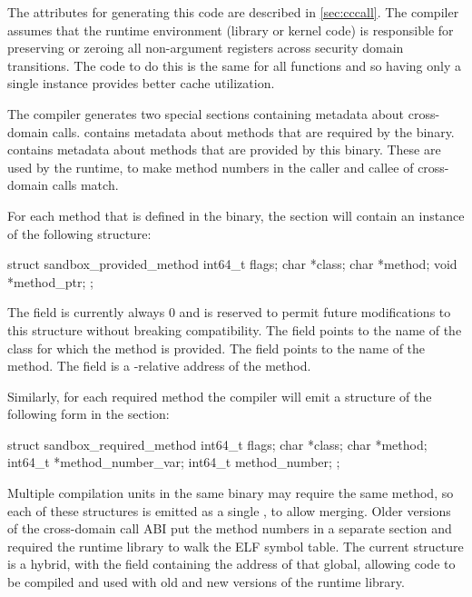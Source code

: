 The attributes for generating this code are described in \autoref{sec:cccall}.
The compiler assumes that the runtime environment (library or kernel code) is responsible for preserving or zeroing all non-argument registers across security domain transitions.
The code to do this is the same for all functions and so having only a single instance provides better cache utilization.

The compiler generates two special sections containing metadata about cross-domain calls.
 contains metadata about methods that are required by the binary.
 contains metadata about methods that are provided by this binary.
These are used by the  runtime, to make method numbers in the caller and callee of cross-domain calls match.

For each method that is defined in the binary, the  section will contain an instance of the following structure:

\begin{csnippet}
struct sandbox_provided_method
{
	int64_t   flags;
	char     *class;
	char     *method;
	void     *method_ptr;
};
\end{csnippet}

The  field is currently always 0 and is reserved to permit future modifications to this structure without breaking compatibility.
The  field points to the name of the class for which the method is provided.
The  field points to the name of the method.
The  field is a -relative address of the method.

Similarly, for each required method the compiler will emit a structure of the following form in the  section:

\begin{csnippet}
struct sandbox_required_method
{
	int64_t   flags;
	char     *class;
	char     *method;
	int64_t  *method_number_var;
	int64_t   method_number;
};
\end{csnippet}

Multiple compilation units in the same binary may require the same method, so each of these structures is emitted as a single , to allow merging.
Older versions of the cross-domain call ABI put the method numbers in a separate section and required the runtime library to walk the ELF symbol table.
The current structure is a hybrid, with the  field containing the address of that global, allowing code to be compiled and used with old and new versions of the runtime library.

